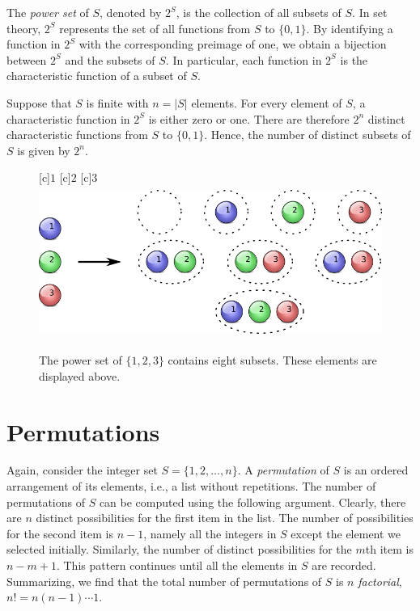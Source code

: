 \begin{example}
The \emph{power set} of $S$, denoted by $2^S$, is the collection of all subsets of $S$. 
In set theory, $2^S$ represents the set of all functions from $S$ to $\{ 0, 1\}$.
By identifying a function in $2^S$ with the corresponding preimage of one, we obtain a bijection between $2^S$ and the subsets of $S$.
In particular, each function in $2^S$ is the characteristic function of a subset of $S$.

Suppose that $S$ is finite with $n = |S|$ elements.
For every element of $S$, a characteristic function in $2^S$ is either zero or one.
There are therefore $2^n$ distinct characteristic functions from $S$ to $\{ 0, 1\}$.
Hence, the number of distinct subsets of $S$ is given by $2^n$.

\begin{figure}[htb!]
\begin{center}
\begin{psfrags}
[c]{$1$}
[c]{$2$}
[c]{$3$}
\includegraphics[height=4.965cm]{Figures/4Chapter/powerset}
\end{psfrags}
\caption{The power set of $\{ 1, 2, 3 \}$ contains eight subsets.
These elements are displayed above.}
\label{figure:PowerSet}
\end{center}
\end{figure}
\end{example}


\section{Permutations}

Again, consider the integer set $S = \{ 1, 2, \ldots, n \}$.
A \emph{permutation} of $S$ is an ordered arrangement of its elements, i.e., a list without repetitions. 
The number of permutations of $S$ can be computed using the following argument.
Clearly, there are $n$ distinct possibilities for the first item in the list.
The number of possibilities for the second item is $n-1$, namely all the integers in $S$ except the element we selected initially.
Similarly, the number of distinct possibilities for the $m$th item is $n - m + 1$.
This pattern continues until all the elements in $S$ are recorded.
Summarizing, we find that the total number of permutations of $S$ is $n$ \emph{factorial}, $n! = n (n-1) \cdots 1$. 

